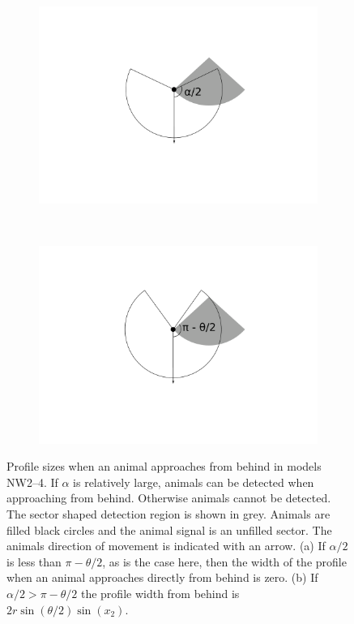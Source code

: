 \begin{figure}[t]
        \centering
        \begin{subfigure}[t]{0.35\textwidth}
                \centering
        \includegraphics[width=1\textwidth, trim=5cm 6cm 4cm 1cm]{imgs/behind.pdf}
                \label{f:NW2--4behind}
                \caption{}
        \end{subfigure}
~ 
        \begin{subfigure}[t]{0.35\textwidth}
                \centering
        \includegraphics[width=1\textwidth, trim=5cm 6cm 4cm 1cm]{imgs/behind2.pdf}
                \label{f:NW2--4behind2}
                \caption{}
        \end{subfigure}

\caption[Profile sizes when an animal approaches from behind in models NW2--4]{Profile sizes when an animal approaches from behind in models NW2--4. If $\alpha$ is relatively large, animals can be detected when approaching from behind. Otherwise animals cannot be detected.  The sector shaped detection region is shown in grey. Animals are filled black circles and the animal signal is an unfilled sector. The animals direction of movement is indicated with an arrow.  (a) If $\alpha/2$ is less than $\pi - \theta/2$, as is the case here, then the width of the profile when an animal approaches directly from behind is zero. (b) If $\alpha/2 > \pi - \theta/2$ the profile width from behind is $2r\sin\left(\theta/2\right)\sin(x_2)$.}
\label{f:NW2--4}
\end{figure}


